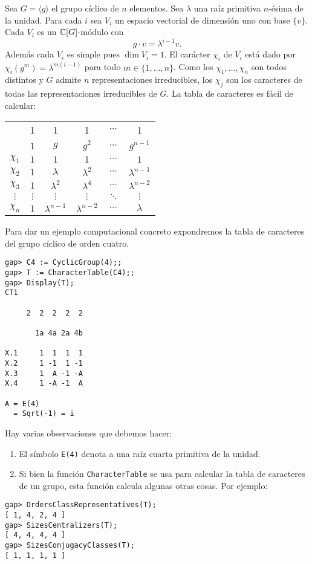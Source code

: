 \begin{example}
	Sea $G=\langle g\rangle$ el grupo cíclico de $n$ elementos. Sea $\lambda$ una raíz primitiva
	$n$-ésima de la unidad. Para cada $i$ sea $V_i$ un espacio vectorial de
	dimensión uno con base $\{v\}$. Cada $V_i$ es un $\mathbb{C}[G]$-módulo con 
	\[
		g\cdot v=\lambda^{i-1}v.
	\]
	Además cada $V_i$ es simple pues $\dim V_i=1$. El carácter $\chi_i$ de
	$V_i$ está dado por $\chi_i(g^m)=\lambda^{m(i-1)}$ para todo
	$m\in\{1,\dots,n\}$. Como los $\chi_1,\dots,\chi_n$ son todos distintos y
	$G$ admite $n$ representaciones irreducibles, los $\chi_j$ son los
	caracteres de todas las representaciones irreducibles de $G$. La tabla de
	caracteres es fácil de calcular:
	\begin{center}
		\begin{tabular}{|c|ccccc|}
			\hline 
			& 1 & 1 & 1 & $\cdots$ & 1\tabularnewline
			& $1$ & $g$ & $g^2$ & $\cdots$ & $g^{n-1}$\tabularnewline
			\hline 
			$\chi_{1}$ & $1$ & $1$ & $1$ & $\cdots$ & $1$\tabularnewline
			$\chi_{2}$ & $1$ & $\lambda$ & $\lambda^2$ & $\cdots$ & $\lambda^{n-1}$\tabularnewline
			$\chi_{3}$ & $1$ & $\lambda^2$ & $\lambda^4$ & $\cdots$ & $\lambda^{n-2}$\tabularnewline
			$\vdots$ & $\vdots$ & $\vdots$ & $\vdots$ & $\ddots$ & $\vdots$\tabularnewline
			$\chi_{n}$ & $1$ & $\lambda^{n-1}$ & $\lambda^{n-2}$ & $\cdots$ & $\lambda$\tabularnewline
			\hline
		\end{tabular}
	\end{center}
	Para dar un ejemplo computacional concreto expondremos la tabla de caracteres del grupo cíclico de orden cuatro. 
\begin{lstlisting}
gap> C4 := CyclicGroup(4);;                       
gap> T := CharacterTable(C4);;
gap> Display(T);
CT1

     2  2  2  2  2

       1a 4a 2a 4b

X.1     1  1  1  1
X.2     1 -1  1 -1
X.3     1  A -1 -A
X.4     1 -A -1  A

A = E(4)
  = Sqrt(-1) = i
\end{lstlisting}
Hay varias observaciones que debemos hacer:
\begin{enumerate}
    \item El símbolo \lstinline{E(4)} denota a una raíz cuarta primitiva de la unidad. 
    \item Si bien la función \lstinline{CharacterTable} se usa para calcular la tabla de caracteres de un grupo, 
    esta función calcula algunas otras cosas. Por ejemplo:
\end{enumerate}
\begin{lstlisting}
gap> OrdersClassRepresentatives(T);
[ 1, 4, 2, 4 ]
gap> SizesCentralizers(T);
[ 4, 4, 4, 4 ]
gap> SizesConjugacyClasses(T);
[ 1, 1, 1, 1 ]
\end{lstlisting}
\end{example}

